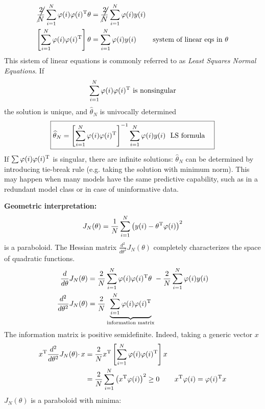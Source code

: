 \begin{equation*}
\begin{aligned}
\cancel{\frac{2}{N}}\sum _{i=1}^{N} \varphi ( i) \varphi ( i)^{\mathrm{T}} \theta  & =\cancel{\frac{2}{N}}\sum _{i=1}^{N} \varphi ( i) y( i) & \\
\left[\sum _{i=1}^{N} \varphi ( i) \varphi ( i)^{\mathrm{T}}\right] \theta  & =\sum _{i=1}^{N} \varphi ( i) y( i) & \text{system of linear eqs in} \ \theta 
\end{aligned}
\end{equation*}
This sistem of linear equations is commonly referred to as \textit{Least Squares Normal Equations}. If 
\begin{equation*}
\sum _{i=1}^{N} \varphi ( i) \varphi ( i)^{\mathrm{T}} \ \text{is nonsingular}
\end{equation*}
the solution is unique, and $ \hat{\theta }_{N}$ is univocally determined
\begin{equation*}
\boxed{\begin{aligned}
\hat{\theta }_{N} =\left[\sum _{i=1}^{N} \varphi ( i) \varphi ( i)\transpose\right]^{-1}\sum _{i=1}^{N} \varphi ( i) y( i) & \ \ \mathbf{\text{LS formula}}
\end{aligned}}
\end{equation*}
If $ \sum \varphi ( i) \varphi ( i)^{\mathrm{T}}$ is singular, there are infinite solutions: $ \hat{\theta }_{N}$ can be determined by introducing tie-break rule (e.g. taking the solution with minimum norm). This may happen when many models have the same predictive capability, such as in a redundant model class or in case of uninformative data.

\textbf{Geometric interpretation:}
\begin{equation*}
J_{N}( \theta ) =\frac{1}{N}\sum _{i=1}^{N}\left( y( i) -\theta ^{\mathrm{T}} \varphi ( i)\right)^{2}
\end{equation*}
is a paraboloid. The Hessian matrix $ \frac{d^{2}}{d\theta ^{2}} J_{N}( \theta )$ completely characterizes the space of quadratic functions.
\begin{equation*}
\begin{aligned}
\frac{d}{d\theta } J_{N}( \theta ) & =\frac{2}{N}\sum _{i=1}^{N} \varphi ( i) \varphi ( i)^{\mathrm{T}} \theta \ -\frac{2}{N}\sum _{i=1}^{N} \varphi ( i) y( i)\\
\frac{d^{2}}{d\theta ^{2}} J_{N}( \theta ) & =\frac{2}{N}\underbrace{\sum _{i=1}^{N} \varphi ( i) \varphi ( i)^{\mathrm{T}}}_{\text{information matrix}}
\end{aligned}
\end{equation*}
The information matrix is positive semidefinite. Indeed, taking a generic vector $ x$
\begin{equation*}
\begin{aligned}
x^{\mathrm{T}}\frac{d^{2}}{d\theta ^{2}} J_{N}( \theta ) \cdotp x & =\frac{2}{N} x^{\mathrm{T}}\left[\sum _{i=1}^{N} \varphi ( i) \varphi ( i)^{\mathrm{T}}\right] x & \\
 & =\frac{2}{N}\sum _{i=1}^{N}\left( x^{\mathrm{T}} \varphi ( i)\right)^{2} \geq 0 & x^{\mathrm{T}} \varphi ( i) =\varphi ( i)^{\mathrm{T}} x
\end{aligned}
\end{equation*}
$ J_{N}( \theta )$ is a paraboloid with minima:


